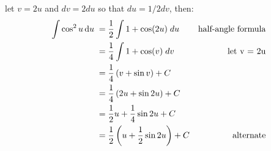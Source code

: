 \def\no{64}
\def\theintegral{\(\int\cos^2{u}\;\dif{u}
\enspace=\enspace%
\tfrac{1}{2}\,{u}\;+\;\tfrac{1}{4}\,\sin{2{u}}\;+\;C\)}

let $v=2u$ and $dv = 2du$ so that $du = 1/2 dv$, then:
\begin{align*}
\int  \cos^2{u} \dif u \;=&\;  \frac{1}{2} \int  1+\cos(2u) \; du & \text{half-angle formula}\\
=&\;  \frac{1}{4} \int  1 + \cos(v) \; dv & \text{let v = 2u}\\
=&\;  \frac{1}{4} \left(v + \sin v \right) + C \\\
=&\;  \frac{1}{4} \left(2u + \sin 2u \right) + C \\
=&\;  \frac{1}{2} u + \frac{1}{4} \sin 2u + C \\
=&\;  \frac{1}{2} \left(u + \frac{1}{2} \sin 2u \right) + C &\text{alternate} \\
\\
\end{align*}
